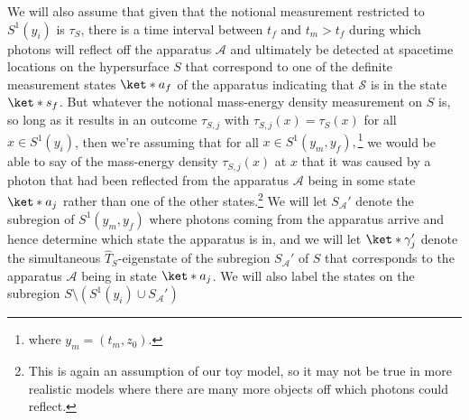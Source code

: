 \documentclass[12pt]{report}
\begin{document}
We will also assume that given that the notional measurement restricted to $S^1(y_i)$ is $\tau_S$, there is a time interval between $t_f$ and $t_m > t_f$  %
%
 during which photons will reflect off the apparatus $\mathcal{A}$ and ultimately be detected at spacetime locations on the hypersurface $S$ that correspond to one of the definite measurement states $\ket*{a_f}$ %
%
 of the apparatus indicating that $\mathcal{S}$ is in the state $\ket*{s_f}$. %
 But whatever the  notional mass-energy density measurement on $S$ is, so long as it results in an outcome $\tau_{S,j}$ with $\tau_{S,j}(x)=\tau_S(x)$ for all $x\in S^1(y_i)$, then we're assuming that for all $x \in S^1(y_m,y_f),$\footnote{where $y_m=(t_m, z_0)$.} we would be able to say of the mass-energy density $\tau_{S,j}(x)$ at $x$ that it was caused by a photon that had been reflected from the apparatus $\mathcal{A}$ being in some state $\ket*{a_j}$ rather than one of the other states.\footnote{This is again an assumption of our toy model, so it may not be true in more realistic models where there are many more objects off which photons could reflect.} We will let $S_{\mathcal{A}}'$ %
  denote the subregion of $S^1(y_m,y_f)$ where photons coming from the apparatus arrive and hence determine which state the apparatus  is in, and we will let $\ket*{\gamma'_j}$ %
   denote the simultaneous $\hat{T}_S$-eigenstate of the subregion $S_{\mathcal{A}}'$ of $S$ that corresponds to the apparatus $\mathcal{A}$ being in state $\ket*{a_j}$.  We will also label the states on the subregion $S\setminus (S^1(y_i)\cup S_{\mathcal{A}}')$ %
\end{document}
